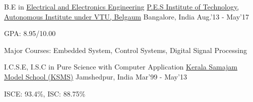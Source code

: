 \begin{cventries}
	\cventry
	{B.E in \href{https://eee.pes.edu/}{Electrical and Electronics Engineering}}
	{\href{https://pesit.pes.edu/}{P.E.S Institute of Technology, Autonomous Institute under VTU, Belgaum}}
	{Bangalore, India}
	{Aug.'13 - May'17}
	{
		\begin{cvitems}
		\item{GPA: 8.95/10.00}
		\item{Major Courses: Embedded System, Control Systems, Digital Signal Processing}
		\end{cvitems}
	}
\end{cventries}

\begin{cventries}
	\cventry
	{I.C.S.E, I.S.C in {Pure Science with Computer Application}}
	{\href{https://ksms.ac.in/}{Kerala Samajam Model School (KSMS)}}
	{Jamshedpur, India}
	{Mar'99 - May'13}
	{
		\begin{cvitems}
		\item{ISCE: 93.4\%, ISC: 88.75\%}
		\end{cvitems}
	}
\end{cventries}
